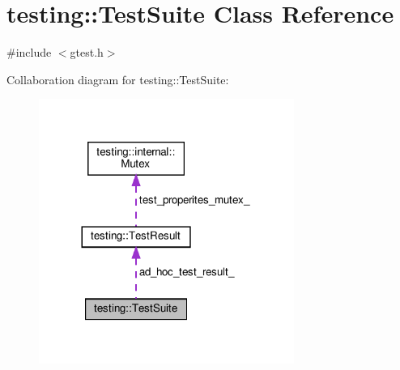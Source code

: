 \hypertarget{classtesting_1_1TestSuite}{}\section{testing\+:\+:Test\+Suite Class Reference}
\label{classtesting_1_1TestSuite}


{\ttfamily \#include $<$gtest.\+h$>$}



Collaboration diagram for testing\+:\+:Test\+Suite\+:\nopagebreak
\begin{figure}[H]
\begin{center}
\leavevmode
\includegraphics[width=236pt]{classtesting_1_1TestSuite__coll__graph}
\end{center}
\end{figure}
